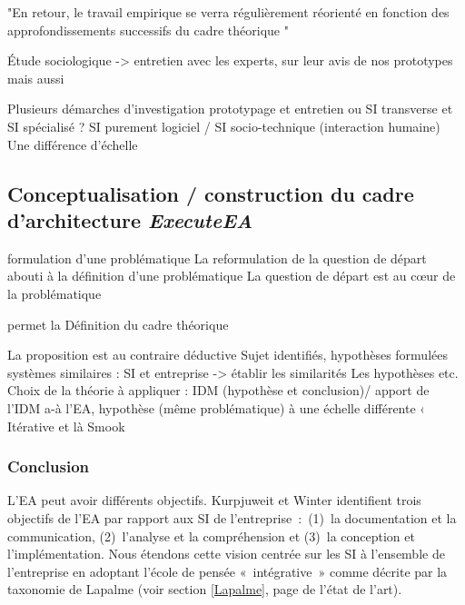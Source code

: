 {"En retour, le travail empirique se verra régulièrement réorienté en fonction 
des approfondissements successifs du cadre théorique "

Étude sociologique -> entretien avec les experts, sur leur avis de nos 
prototypes mais aussi 

Plusieurs démarches d'investigation 
prototypage et entretien 
ou SI transverse et SI spécialisé ? SI purement logiciel / SI socio-technique 
(interaction humaine) 
Une différence d'échelle 
		 


	\subsection{Conceptualisation / construction du cadre d'architecture 
\textit{ExecuteEA}}
formulation d'une problématique 
La reformulation de la question de départ abouti à la définition d'une 
problématique 
La question de départ est au cœur de la problématique 

permet la Définition du cadre théorique 

La proposition est au contraire déductive
Sujet identifiés, hypothèses formulées
systèmes similaires : SI et entreprise -> établir les similarités
Les hypothèses etc.  
Choix de la théorie à appliquer : IDM (hypothèse et conclusion)/ apport de l'IDM 
a-à l'EA, hypothèse (même problématique) à une échelle différente  ‹
Itérative et là Smook 

	\subsubsection{Conclusion}
	
	
	
	
	
	
	

L'EA peut avoir différents objectifs. Kurpjuweit et Winter 
\cite{kurpjuweit2007viewpoint} identifient trois objectifs de l'EA par rapport 
aux SI de l'entreprise~:~(1)~la documentation et la communication, (2)~l'analyse 
et la compréhension et (3)~la conception et l'implémentation. Nous étendons 
cette vision centrée sur les SI à l'ensemble de l'entreprise en adoptant l'école 
de pensée «~intégrative~» comme décrite par la taxonomie de Lapalme (voir 
section \ref{Lapalme}, page \pageref{Lapalme} de l'état de l'art). 

}
